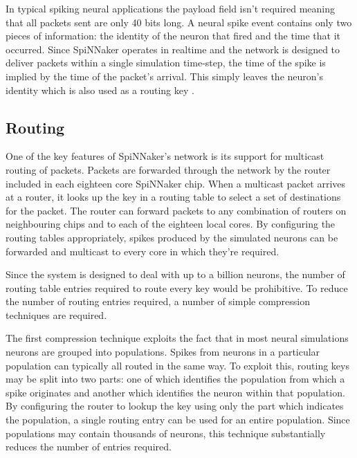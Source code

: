 			In typical spiking neural applications the payload field isn't required
			meaning that all packets sent are only 40 bits long. A neural spike event
			contains only two pieces of information: the identity of the neuron that
			fired and the time that it occurred. Since SpiNNaker operates in realtime
			and the network is designed to deliver packets within a single simulation
			time-step, the time of the spike is implied by the time of the packet's
			arrival. This simply leaves the neuron's identity which is also used as a
			routing key \cite{davies12}.
		
		\subsection{Routing}
			
			\label{sec:spinn-router}
			
			One of the key features of SpiNNaker's network is its support for
			multicast routing of packets. Packets are forwarded through the network by
			the router included in each eighteen core SpiNNaker chip. When a multicast
			packet arrives at a router, it looks up the key in a routing table to
			select a set of destinations for the packet. The router can forward
			packets to any combination of routers on neighbouring chips and to each of
			the eighteen local cores. By configuring the routing tables appropriately,
			spikes produced by the simulated neurons can be forwarded and multicast to
			every core in which they're required.
			
			Since the system is designed to deal with up to a billion neurons, the
			number of routing table entries required to route every key would be
			prohibitive. To reduce the number of routing entries required, a number of
			simple compression techniques are required.
			
			The first compression technique exploits the fact that in most neural
			simulations neurons are grouped into populations. Spikes from neurons in a
			particular population can typically all routed in the same way. To exploit
			this, routing keys may be split into two parts: one of which identifies
			the population from which a spike originates and another which identifies
			the neuron within that population.  By configuring the router to lookup
			the key using only the part which indicates the population, a single
			routing entry can be used for an entire population. Since populations may
			contain thousands of neurons, this technique substantially reduces the
			number of entries required.
			
